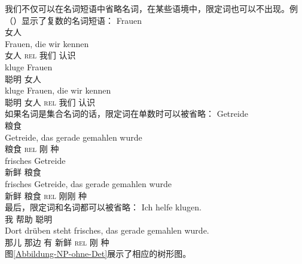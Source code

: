 我们不仅可以在名词短语中省略名词，在某些语境中，限定词也可以不出现。例（）显示了复数的名词短语：
\eal
\ex 
\gll Frauen\\
	 女人\\
\ex 
\gll Frauen, die wir kennen\\
	 女人 \textsc{rel} 我们 认识\\
\ex 
\gll kluge Frauen\\
	 聪明 女人\\
\ex 
\gll kluge Frauen, die wir kennen\\
	 聪明 女人 \textsc{rel} 我们 认识\\
\zl
如果名词是集合名词的话，限定词在单数时可以被省略：
\eal
\ex 
\gll Getreide\\
	 粮食\\
\ex 
\gll Getreide, das gerade gemahlen wurde\\
	 粮食 \textsc{rel} 刚 种 \passivepst{}\\
\ex 
\gll frisches Getreide\\
	 新鲜 粮食\\
\ex 
\gll frisches Getreide, das gerade gemahlen wurde\\
	 新鲜 粮食 \textsc{rel} 刚刚 种 \passivepst{}\\
\zl
最后，限定词和名词都可以被省略：
\eal
\ex 
\gll Ich helfe klugen.\\
	 我 帮助 聪明\\
\ex 
\gll Dort drüben steht frisches, das gerade gemahlen wurde.\\
	 那儿 那边 有 新鲜 \textsc{rel} 刚 种 \passivepst{}\\
\zl
图\vref{Abbildung-NP-ohne-Det}展示了相应的树形图。

